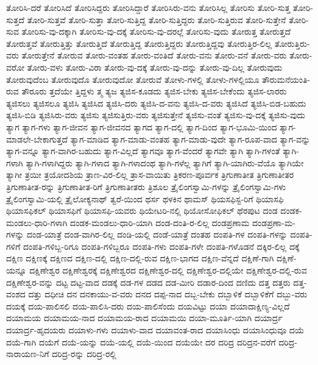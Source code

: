 {ತೋರಿಸಿ-ದರೆ
ತೋರಿಸಿದೆ
ತೋರಿಸಿದ್ದರು
ತೋರಿಸಿದ್ದಾರೆ
ತೋರಿಸಿರು-ವನು
ತೋರಿಸಿಲ್ಲ
ತೋರಿಸು
ತೋರಿ-ಸುತ್ತ
ತೋರಿ-ಸುತ್ತದೆ
ತೋರಿ-ಸುತ್ತವೆ
ತೋರಿ-ಸುತ್ತಾ
ತೋರಿ-ಸುತ್ತಿದ್ದ
ತೋರಿ-ಸುತ್ತಿದ್ದರು
ತೋರಿ-ಸುತ್ತಿರುವ
ತೋರಿ-ಸುತ್ತೇನೆ
ತೋರಿ-ಸುವ
ತೋರಿಸು-ವು-ದಕ್ಕಾಗಿ
ತೋರಿಸು-ವು-ದಕ್ಕೆ
ತೋರಿಸು-ವು-ದರಲ್ಲೆ
ತೋರಿಸು-ವುದು
ತೋರುತ್ತ
ತೋರುತ್ತದೆ
ತೋರುತ್ತವೆ
ತೋರುತ್ತಿತ್ತು
ತೋರುತ್ತಿದೆ
ತೋರುತ್ತಿದ್ದ
ತೋರುತ್ತಿದ್ದರು
ತೋರುತ್ತಿದ್ದವು
ತೋರುತ್ತಿರ-ಲಿಲ್ಲ
ತೋರುತ್ತಿರು-ವರು
ತೋರುತ್ತೇನೆ
ತೋರುವ
ತೋರು-ವಂತಹ
ತೋರು-ವಂತಿದೆ
ತೋರು-ವನು
ತೋರು-ವನೆ
ತೋರು-ವರು
ತೋರು-ವರೋ
ತೋರು-ವಳು
ತೋರು-ವಿರಾ
ತೋರು-ವು-ದಕ್ಕೆ
ತೋರು-ವು-ದನ್ನು
ತೋರು-ವು-ದಿಲ್ಲ
ತೋರುವುದು
ತೋರುವುದೆಂಬ
ತೋರುವುದೊ
ತೋರುವುದೋ
ತೋರುವೆ
ತೋಳು-ಗಳಲ್ಲಿ
ತೋಳು-ಗಳಲ್ಲಿಯೂ
ತೌರುಮನೆಯಂತಿ-ರುವ
ತೌರೂರು
ತ್ತದೆಯೇ
ತ್ತಿದ್ದಳು
ತ್ಮ
ತ್ಯಜ
ತ್ಯಜಿಸ-ಕೂಡದು
ತ್ಯಜಿಸ-ಬೇಕು
ತ್ಯಜಿಸ-ಬೇಕೆಂದು
ತ್ಯಜಿಸ-ಲಾರರು
ತ್ಯಜಿಸಲು
ತ್ಯಜಿಸಲೂ
ತ್ಯಜಿಸಿ
ತ್ಯಜಿಸಿದ
ತ್ಯಜಿಸಿ-ದರು
ತ್ಯಜಿಸಿ-ದ-ವನು
ತ್ಯಜಿಸಿ-ದ-ವರು
ತ್ಯಜಿಸಿದೆ
ತ್ಯಜಿಸಿ-ಬಿಡ-ಬಹುದು
ತ್ಯಜಿಸಿ-ಬಿಡಿ
ತ್ಯಜಿಸಿರು-ವರು
ತ್ಯಜಿಸು
ತ್ಯಜಿಸುತ್ತಿರು-ವರು
ತ್ಯಜಿಸುತ್ತೇನೆ
ತ್ಯಜಿಸು-ವಂತೆ
ತ್ಯಜಿಸು-ವು-ದಕ್ಕೆ
ತ್ಯಜಿಸು-ವುದು
ತ್ಯಾಗ
ತ್ಯಾಗ-ಗಳು
ತ್ಯಾಗ-ಜೀವನ
ತ್ಯಾಗ-ಜೀವನದ
ತ್ಯಾಗದ
ತ್ಯಾಗ-ದಲ್ಲಿ
ತ್ಯಾಗ-ದಿಂದ
ತ್ಯಾಗ-ಭೂಮಿ-ಯಿಂದ
ತ್ಯಾಗ-ಮಾಡಲೇ-ಬೇಕಾಗುತ್ತದೆ
ತ್ಯಾಗ-ಮಾಡಿದ
ತ್ಯಾಗ-ಮಾಡು-ವಂತಹ
ತ್ಯಾಗ-ಮಾಡು-ವುದೇ
ತ್ಯಾಗ-ರೂಪ-ವಾದ
ತ್ಯಾಗ-ವನ್ನು
ತ್ಯಾಗ-ವನ್ನೂ
ತ್ಯಾಗ-ವಾಗಿರ-ಬಹುದು
ತ್ಯಾಗ-ವಿಲ್ಲದೆ
ತ್ಯಾಗವೂ
ತ್ಯಾಗ-ವೆಂದರೆ
ತ್ಯಾಗವೇ
ತ್ಯಾಗಿ
ತ್ಯಾಗಿ-ಗಳಂತೆ
ತ್ಯಾಗಿ-ಗಳಾಗಿ
ತ್ಯಾಗಿ-ಗಳಾಗಿದ್ದರು
ತ್ಯಾಗಿ-ಗಳಾದ
ತ್ಯಾಗಿ-ಗಳಾದಂಥ
ತ್ಯಾಗಿ-ಗಳೆಲ್ಲ
ತ್ಯಾಗಿಗೆ
ತ್ಯಾಗಿ-ಯಾಗಿರು-ವೆಯೊ
ತ್ಯಾಗಿಯೇ
ತ್ಯಾಗೀ
ತ್ರಯೀ
ತ್ರಯೋದಶಿಯ
ತ್ರಾಣ-ವಿರ-ಲಿಲ್ಲ
ತ್ರಾಸ-ವಾಯಿತು
ತ್ರಿಕರಣ-ಪೂರ್ವಕ
ತ್ರಿಗುಣಾತೀತ
ತ್ರಿಗುಣಾತೀತರ
ತ್ರಿಗುಣಾತೀತ-ರನ್ನು
ತ್ರಿಗುಣಾತೀತ-ರಿಗೆ
ತ್ರಿಗುಣಾತೀತರು
ತ್ರಿಶೂಲ
ತ್ರೈಲಿಂಗಸ್ವಾಮಿ-ಗಳನ್ನು
ತ್ರೈಲಿಂಗಸ್ವಾಮಿ-ಗಳು
ತ್ರೈಲಿಂಗಸ್ವಾಮಿ-ಯಲ್ಲಿ
ತ್ರೈಲೋಕ್ಯನಾಥ್
ತ್ವರೆ-ಯಿಂದ
ಥರ್ಸ
ಥಳಕಿನ
ಥಾಮಸ್
ಥಿಯಸಫಿಸ್ಟ-ರಿಗೆ
ಥಿಯಾಸಫಿ
ಥಿಯಾಸಫಿಕಲ್
ಥಿಯಾಸಫಿಗೆ
ಥಿಯಾಸಫಿ-ಯವರು
ಥಿಯೇಟರಿ-ನಲ್ಲಿ
ಥಿಯೋಸೋಫಿಕಲ್
ಥೆರಪುಟ
ದಂಡ
ದಂಡಕ-ಮಂಡಲು-ಧಾರಿ-ಗಳಾಗಿ
ದಂಡಕ-ಮಂಡಲು-ಧಾರಿ-ಯಾಗಿ
ದಂಡ-ದಂತಿ-ರ-ಲಿಲ್ಲ
ದಂಡಪ್ರಣಾಮ
ದಂಡಪ್ರಣಾ-ಮ-ಗಳನ್ನು
ದಂಡ-ಯಾತ್ರೆ
ದಂಡ-ವಾಗಿರ-ಲಿಲ್ಲ
ದಂಡಿ-ಯಲ್ಲಿ
ದಂಡೆ-ಯಾತ್ರೆ
ದಂತಹ
ದಂಪತಿ-ಗಳ
ದಂಪತಿ-ಗಳನ್ನು
ದಂಪತಿ-ಗಳಿಗೆ
ದಂಪತಿ-ಗಳಿಬ್ಬ-ರಿಗೂ
ದಂಪತಿ-ಗಳಿಬ್ಬರೂ
ದಂಪತಿ-ಗಳು
ದಂಪತಿ-ಗಳೇ
ದಂಪತಿ-ಗಳೊಡನೆ
ದಕ್ಕಿರ-ಲಿಲ್ಲ
ದಕ್ಕೆ
ದಕ್ಷಿಣ
ದಕ್ಷಿಣಕ್ಕೆ
ದಕ್ಷಿಣದ
ದಕ್ಷಿಣ-ದಲ್ಲಿ
ದಕ್ಷಿಣ-ದಲ್ಲಿ-ರುವ
ದಕ್ಷಿಣ-ಭಾಗದ
ದಕ್ಷಿಣ-ವೆನ್ನದೆ
ದಕ್ಷಿಣೆ-ಗಾಗಿ
ದಕ್ಷಿಣೆ-ಯನ್ನೂ
ದಕ್ಷಿಣೇಶ್ವರ
ದಕ್ಷಿಣೇಶ್ವರಕ್ಕೆ
ದಕ್ಷಿಣೇಶ್ವರದ
ದಕ್ಷಿಣೇಶ್ವರ-ದಲ್ಲಿ
ದಕ್ಷಿಣೇಶ್ವರ-ದಲ್ಲಿಯೇ
ದಕ್ಷಿಣೇಶ್ವರ-ದಲ್ಲಿ-ರುವ
ದಕ್ಷಿಣೇಶ್ವರ-ವನ್ನು
ದಟ್ಟ
ದಟ್ಟ-ವಾದ
ದಡಕ್ಕೆ
ದಡ-ಗಳ
ದಡದ
ದಡ-ಮೀರಿ
ದಡಾರ-ದಿಂದ
ದಣಿದು
ದತ್ತ
ದತ್ತರು
ದತ್ತ-ವಂಶದ
ದತ್ತು
ದಧೀಚಿ
ದನ
ದನಕಾಯು-ವ-ವರು
ದನದ
ದಪ್ಪ-ನಾದ
ದಬ್ಬ-ಬೇಕು
ದಬ್ಬಾಳಿಕೆ
ದಬ್ಬಾಳಿಕೆಗೆ
ದಬ್ಬು-ವರು
ದಯಕ್ಕೆ
ದಯ-ಪಾಲಿಸಲಿ
ದಯ-ಪಾಲಿಸಿ-ದರು
ದಯ-ಪಾಲಿಸೆಂದು
ದಯವಿಟ್ಟು
ದಯಾ
ದಯಾದಾಕ್ಷಿಣ್ಯ-ವಿಲ್ಲದೆ
ದಯಾಮಯ
ದಯಾಮಯ-ನಾದ
ದಯಾಮಯ-ರಾದ
ದಯಾಮಯಿ
ದಯಾ-ಮೂರ್ತಿ-ಯಾಗಿ
ದಯಾರ್ದ್ರ
ದಯಾರ್ದ್ರ-ಹೃದಯರು
ದಯಾಳು-ಗಳು
ದಯಾಳು-ವಾದ
ದಯಾವಂತ-ರಾದ
ದಯಾಸಿಂಧು
ದಯಾಸಿಂಧುವೂ
ದಯೆ
ದಯೆ-ಗಾಗಿ
ದಯೆಗೆ
ದಯೆ-ಯನ್ನು
ದಯೆ-ಯಲ್ಲಿ
ದಯೆ-ಯಿಂದ
ದಯೆಯೇ
ದರ
ದರಿದ್ರ
ದರಿದ್ರನ-ವರೆಗೆ
ದರಿದ್ರ-ನಾರಾಯಣ-ನಿಗೆ
ದರಿದ್ರ-ರನ್ನು
ದರಿದ್ರ-ರಲ್ಲಿ
}
